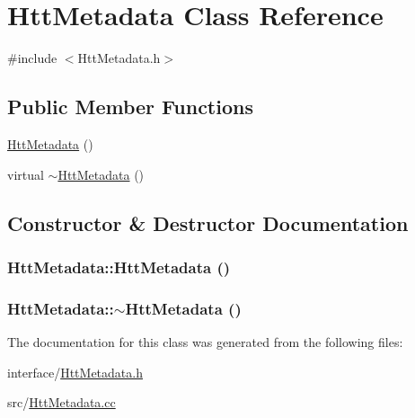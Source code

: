 \hypertarget{classHttMetadata}{
\section{HttMetadata Class Reference}
\label{classHttMetadata}
}


{\ttfamily \#include $<$HttMetadata.h$>$}\subsection*{Public Member Functions}
\begin{DoxyCompactItemize}
\item 
\hyperlink{classHttMetadata_aeefb62546823d0ff8f1307d6b72dcf3b}{HttMetadata} ()
\item 
virtual \hyperlink{classHttMetadata_a669dce1333a53c59fb0c141e6bfcfa3f}{$\sim$HttMetadata} ()
\end{DoxyCompactItemize}


\subsection{Constructor \& Destructor Documentation}
\hypertarget{classHttMetadata_aeefb62546823d0ff8f1307d6b72dcf3b}{
\subsubsection[{HttMetadata}]{\setlength{\rightskip}{0pt plus 5cm}HttMetadata::HttMetadata ()}}
\label{classHttMetadata_aeefb62546823d0ff8f1307d6b72dcf3b}
\hypertarget{classHttMetadata_a669dce1333a53c59fb0c141e6bfcfa3f}{
\subsubsection[{$\sim$HttMetadata}]{\setlength{\rightskip}{0pt plus 5cm}HttMetadata::$\sim$HttMetadata ()}}
\label{classHttMetadata_a669dce1333a53c59fb0c141e6bfcfa3f}


The documentation for this class was generated from the following files:\begin{DoxyCompactItemize}
\item 
interface/\hyperlink{HttMetadata_8h}{HttMetadata.h}\item 
src/\hyperlink{HttMetadata_8cc}{HttMetadata.cc}\end{DoxyCompactItemize}

